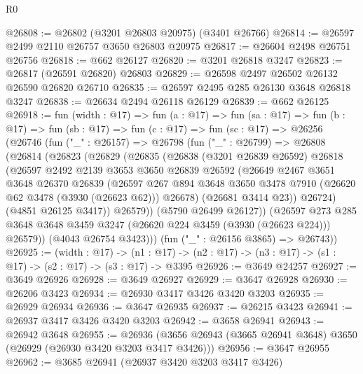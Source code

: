 \begin{lexlean}{R0}
\begin{coremodule}
@26808 := @26802 (@3201 @26803 @20975) (@3401 @26766)
@26814 := @26597 @2499 @2110 @26757 @3650 @26803 @20975
@26817 := @26604 @2498 @26751 @26756
@26818 := @662 @26127
@26820 := @3201 @26818 @3247
@26823 := @26817 (@26591 @26820) @26803
@26829 := @26598 @2497 @26502 @26132 @26590 @26820 @26710
@26835 := @26597 @2495 @285 @26130 @3648 @26818 @3247
@26838 := @26634 @2494 @26118 @26129
@26839 := @662 @26125
@26918 := fun (width : @17) =>
  fun (a : @17) =>
  fun (sa : @17) =>
  fun (b : @17) =>
  fun (sb : @17) =>
  fun (c : @17) =>
  fun (sc : @17) =>
  @26256
    (@26746
      (fun ("_" : @26157) =>
      @26798
        (fun ("_" : @26799) =>
        @26808
          (@26814
            (@26823
              (@26829
                (@26835
                  (@26838
                    (@3201 @26839 @26592)
                    @26818
                    (@26597
                      @2492
                      @2139
                      @3653
                      @3650
                      @26839
                      @26592
                      (@26649
                        @2467
                        @3651
                        @3648
                        @26370
                        @26839
                        (@26597
                          @267
                          @894
                          @3648
                          @3650
                          @3478
                          @7910
                          (@26620 @62 @3478 (@3930 (@26623 @62)))
                          @26678)
                        (@26681 @3414 @23))
                      @26724)
                    (@4851 @26125 @3417))
                  @26579))
              (@5790 @26499 @26127))
            (@26597
              @273
              @285
              @3648
              @3648
              @3459
              @3247
              (@26620 @224 @3459 (@3930 (@26623 @224)))
              @26579))
          (@4043 @26754 @3423)))
      (fun ("_" : @26156 @3865) => @26743))
@26925 := (width : @17) ->
  (n1 : @17) -> (n2 : @17) -> (n3 : @17) -> (s1 : @17) -> (s2 : @17) -> (s3 : @17) -> @3395
@26926 := @3649 @24257
@26927 := @3649 @26926
@26928 := @3649 @26927
@26929 := @3647 @26928
@26930 := @26206 @3423
@26934 := @26930 @3417 @3426 @3420 @3203
@26935 := @26929 @26934
@26936 := @3647 @26935
@26937 := @26215 @3423
@26941 := @26937 @3417 @3426 @3420 @3203
@26942 := @3658 @26941
@26943 := @26942 @3648
@26955 := @26936 (@3656 @26943 (@3665 @26941 @3648) @3650 (@26929 (@26930 @3420 @3203 @3417 @3426)))
@26956 := @3647 @26955
@26962 := @3685 @26941 (@26937 @3420 @3203 @3417 @3426)

\end{coremodule}
\end{lexlean}
